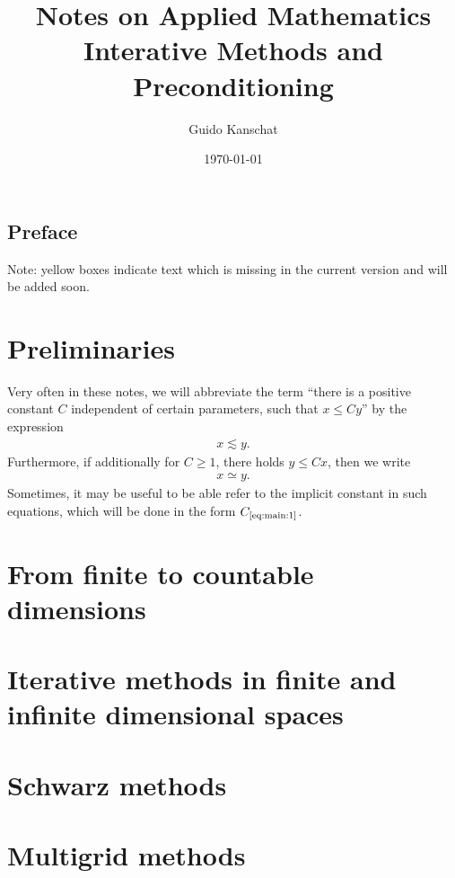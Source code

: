 \documentclass[USenglish]{report}
\title{\textbf{Notes on Applied Mathematics}
\\[5mm]
{\large Interative Methods and Preconditioning}}
\author{Guido Kanschat}
\date{\today}
\def\constref#1{C_{\text{\ref{#1}}}}
\begin{document}
\maketitle

\section*{Preface}

\thispagestyle{empty}
\begin{todo}
  Note: yellow boxes indicate text which is missing in the current
  version and will be added soon.
\end{todo}
\setcounter{page}{0}

\tableofcontents

\chapter{Preliminaries}

\begin{notation}
  Very often in these notes, we will abbreviate the term ``there is a
  positive constant $C$ independent of certain parameters, such that $x \le C
  y$'' by the expression
  \begin{gather}
    \label{eq:main:1}
    x \lesssim y.
  \end{gather}
  Furthermore, if additionally for $C\ge 1$, there holds  $y \le Cx$,
  then we write
  \begin{gather*}
    x \simeq y.
  \end{gather*}
  Sometimes, it may be useful to be able refer to the implicit
  constant in such equations, which will be done in the form  $\constref{eq:main:1}$.
\end{notation}

\chapter{From finite to countable dimensions}


\chapter{Iterative methods in finite and infinite dimensional spaces}





\chapter{Schwarz methods}
\label{cha:iteration:schwarz-methods}


\chapter{Multigrid methods}
\label{cha:iteration:multigrid-methods}


\printbibliography
\printindex
\end{document}
